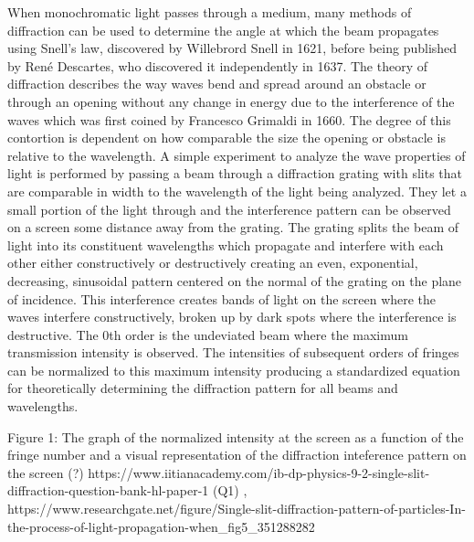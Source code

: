 \documentclass[11pt]{article}
\begin{document}
    When monochromatic light passes through a medium, many methods of
diffraction can be used to determine the angle at which the beam
propagates using Snell's law, discovered by Willebrord Snell in 1621,
before being published by René Descartes, who discovered it
independently in 1637. The theory of diffraction describes the way waves
bend and spread around an obstacle or through an opening without any
change in energy due to the interference of the waves which was first
coined by Francesco Grimaldi in 1660. The degree of this contortion is
dependent on how comparable the size the opening or obstacle is relative
to the wavelength. A simple experiment to analyze the wave properties of
light is performed by passing a beam through a diffraction grating with
slits that are comparable in width to the wavelength of the light being
analyzed. They let a small portion of the light through and the
interference pattern can be observed on a screen some distance away from
the grating. The grating splits the beam of light into its constituent
wavelengths which propagate and interfere with each other either
constructively or destructively creating an even, exponential,
decreasing, sinusoidal pattern centered on the normal of the grating on
the plane of incidence. This interference creates bands of light on the
screen where the waves interfere constructively, broken up by dark spots
where the interference is destructive. The 0th order is the undeviated
beam where the maximum transmission intensity is observed. The
intensities of subsequent orders of fringes can be normalized to this
maximum intensity producing a standardized equation for theoretically
determining the diffraction pattern for all beams and wavelengths.

    Figure 1: The graph of the normalized intensity at the screen as a
function of the fringe number and a visual representation of the
diffraction inteference pattern on the screen (?)
https://www.iitianacademy.com/ib-dp-physics-9-2-single-slit-diffraction-question-bank-hl-paper-1
(Q1) ,
https://www.researchgate.net/figure/Single-slit-diffraction-pattern-of-particles-In-the-process-of-light-propagation-when\_fig5\_351288282
\end{document}
